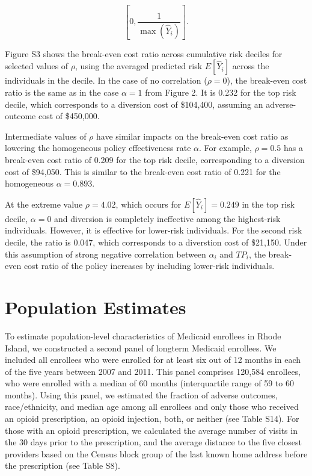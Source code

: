 \documentclass[9pt,twoside]{pnas-new}
\begin{document}
\[ \left[0, \frac{1}{\max(\hat{Y}_i)}\right]. \]

Figure S3 shows the break-even cost ratio across cumulative risk deciles for selected values of $\rho$, using the averaged predicted risk $E[\hat{Y}_i]$ across the individuals in the decile. In the case of no correlation ($\rho=0$), the break-even cost ratio is the same as in the case $\alpha=1$ from Figure 2. It is 0.232 for the top risk decile, which corresponds to a diversion cost of \$104,400, assuming an adverse-outcome cost of \$450,000.

Intermediate values of $\rho$ have similar impacts on the break-even cost ratio as lowering the homogeneous policy effectiveness rate $\alpha$. For example, $\rho=0.5$ has a break-even cost ratio of 0.209 for the top risk decile, corresponding to a diversion cost of \$94,050. This is similar to the break-even cost ratio of 0.221 for the homogeneous $\alpha=0.893$.

At the extreme value $\rho = 4.02$, which occurs for $E[\hat{Y}_i]=0.249$ in the top risk decile, $\alpha=0$ and diversion is completely ineffective among the highest-risk individuals. However, it is effective for lower-risk individuals. For the second risk decile, the ratio is 0.047, which corresponds to a diverstion cost of \$21,150. Under this assumption of strong negative correlation between $\alpha_i$ and $TP_i$, the break-even cost ratio of the policy increases by including lower-risk individuals.

\section{Population Estimates}

To estimate population-level characteristics of Medicaid enrollees in Rhode Island, we constructed a second panel of longterm Medicaid enrollees. We included all enrollees who were enrolled for at least six out of 12 months in each of the five years between 2007 and 2011. This panel comprises 120,584 enrollees, who were enrolled with a median of 60 months (interquartile range of 59 to 60 months). Using this panel, we estimated the fraction of adverse outcomes, race/ethnicity, and median age among all enrollees and only those who received an opioid prescription, an opioid injection, both, or neither (see Table S14). For those with an opioid prescription, we calculated the average number of visits in the 30 days prior to the prescription, and the average distance to the five closest providers based on the Census block group of the last known home address before the prescription (see Table S8).
\end{document}
